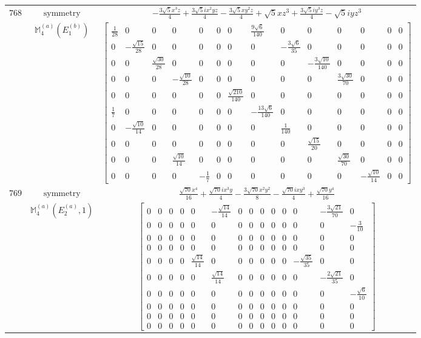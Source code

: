 \documentclass[fleqn,8pt,landscape]{jsarticle}
\begin{document}
\begin{longtable}{ccc}
$ 768 $ & $ \text{symmetry} $ & $ - \frac{3 \sqrt{5} x^{3} z}{4} + \frac{3 \sqrt{5} i x^{2} y z}{4} - \frac{3 \sqrt{5} x y^{2} z}{4} + \sqrt{5} x z^{3} + \frac{3 \sqrt{5} i y^{3} z}{4} - \sqrt{5} i y z^{3} $ \\
$  $ & $ \mathbb{M}_{4}^{(a)}(E_{1}^{(b)}) $ & $ \begin{bmatrix} \frac{1}{28} & 0 & 0 & 0 & 0 & 0 & 0 & \frac{9 \sqrt{6}}{140} & 0 & 0 & 0 & 0 & 0 & 0 \\ 0 & - \frac{\sqrt{15}}{28} & 0 & 0 & 0 & 0 & 0 & 0 & - \frac{3 \sqrt{6}}{35} & 0 & 0 & 0 & 0 & 0 \\ 0 & 0 & \frac{\sqrt{30}}{28} & 0 & 0 & 0 & 0 & 0 & 0 & - \frac{3 \sqrt{10}}{140} & 0 & 0 & 0 & 0 \\ 0 & 0 & 0 & - \frac{\sqrt{10}}{28} & 0 & 0 & 0 & 0 & 0 & 0 & \frac{3 \sqrt{30}}{70} & 0 & 0 & 0 \\ 0 & 0 & 0 & 0 & 0 & 0 & \frac{\sqrt{210}}{140} & 0 & 0 & 0 & 0 & 0 & 0 & 0 \\ \frac{1}{7} & 0 & 0 & 0 & 0 & 0 & 0 & - \frac{13 \sqrt{6}}{140} & 0 & 0 & 0 & 0 & 0 & 0 \\ 0 & - \frac{\sqrt{10}}{14} & 0 & 0 & 0 & 0 & 0 & 0 & \frac{1}{140} & 0 & 0 & 0 & 0 & 0 \\ 0 & 0 & 0 & 0 & 0 & 0 & 0 & 0 & 0 & \frac{\sqrt{15}}{20} & 0 & 0 & 0 & 0 \\ 0 & 0 & 0 & \frac{\sqrt{10}}{14} & 0 & 0 & 0 & 0 & 0 & 0 & \frac{\sqrt{30}}{70} & 0 & 0 & 0 \\ 0 & 0 & 0 & 0 & - \frac{1}{7} & 0 & 0 & 0 & 0 & 0 & 0 & - \frac{\sqrt{10}}{14} & 0 & 0 \end{bmatrix} $ \\ \hline
$ 769 $ & $ \text{symmetry} $ & $ \frac{\sqrt{70} x^{4}}{16} + \frac{\sqrt{70} i x^{3} y}{4} - \frac{3 \sqrt{70} x^{2} y^{2}}{8} - \frac{\sqrt{70} i x y^{3}}{4} + \frac{\sqrt{70} y^{4}}{16} $ \\
$  $ & $ \mathbb{M}_{4}^{(a)}(E_{2}^{(a)},1) $ & $ \begin{bmatrix} 0 & 0 & 0 & 0 & 0 & - \frac{\sqrt{14}}{14} & 0 & 0 & 0 & 0 & 0 & 0 & - \frac{3 \sqrt{21}}{70} & 0 \\ 0 & 0 & 0 & 0 & 0 & 0 & 0 & 0 & 0 & 0 & 0 & 0 & 0 & - \frac{3}{10} \\ 0 & 0 & 0 & 0 & 0 & 0 & 0 & 0 & 0 & 0 & 0 & 0 & 0 & 0 \\ 0 & 0 & 0 & 0 & 0 & 0 & 0 & 0 & 0 & 0 & 0 & 0 & 0 & 0 \\ 0 & 0 & 0 & 0 & \frac{\sqrt{14}}{14} & 0 & 0 & 0 & 0 & 0 & 0 & - \frac{\sqrt{35}}{35} & 0 & 0 \\ 0 & 0 & 0 & 0 & 0 & \frac{\sqrt{14}}{14} & 0 & 0 & 0 & 0 & 0 & 0 & - \frac{2 \sqrt{21}}{35} & 0 \\ 0 & 0 & 0 & 0 & 0 & 0 & 0 & 0 & 0 & 0 & 0 & 0 & 0 & - \frac{\sqrt{6}}{10} \\ 0 & 0 & 0 & 0 & 0 & 0 & 0 & 0 & 0 & 0 & 0 & 0 & 0 & 0 \\ 0 & 0 & 0 & 0 & 0 & 0 & 0 & 0 & 0 & 0 & 0 & 0 & 0 & 0 \\ 0 & 0 & 0 & 0 & 0 & 0 & 0 & 0 & 0 & 0 & 0 & 0 & 0 & 0 \end{bmatrix} $ \\ \hline

\end{longtable}
\end{document}
